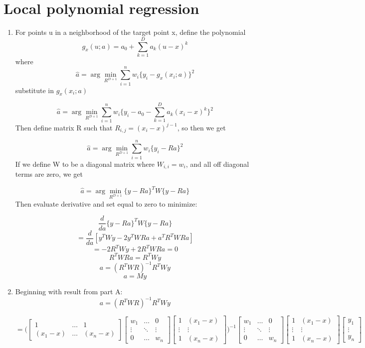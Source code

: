 \documentclass[10pt]{article}
\begin{document}
    \section*{Local polynomial regression}
        \begin{enumerate}[label=(\Alph*)]
        \item

        For points u in a neighborhood of the target point x, define the polynomial
        $$g_x(u;a) = a_0 + \sum_{k=1}^Da_k(u-x)^k$$
        where 
        $$\hat{a} = \arg \min_{R^{D+1}}  \sum_{i=1}^{n}w_i\{y_i-g_x(x_i;a)\}^2$$
        substitute in $g_x(x_i;a)$

        $$\hat{a} = \arg \min_{R^{D+1}}  \sum_{i=1}^{n}w_i\{y_i-a_0 - \sum_{k=1}^Da_k(x_i-x)^k\}^2$$
        Then define matrix R such that $R_{i,j} = (x_i-x)^{j-1}$, so then we get 

        $$\hat{a} = \arg \min_{R^{D+1}}  \sum_{i=1}^{n}w_i\{y_i-Ra\}^2$$
        If we define W to be a diagonal matrix where $W_{i,i}=w_i$, and all off diagonal terms are zero, we get

        $$\hat{a} = \arg \min_{R^{D+1}}  \{y-Ra\}^TW\{y-Ra\}$$
        Then evaluate derivative and set equal to zero to minimize:

        $$\frac{d}{da}\{y-Ra\}^TW\{y-Ra\}$$
        $$=\frac{d}{da}[y^TWy-2y^TWRa+a^TR^TWRa]$$
        $$=-2R^TWy+2R^TWRa = 0$$
        $$R^TWRa=R^TWy$$
        $$a = (R^TWR)^{-1}R^TWy$$
        $$a=My$$
        \item
        Beginning with result from part A:
        $$a = (R^TWR)^{-1}R^TWy$$


        $$=\Bigg(
        \begin{bmatrix}
        1 & \dots & 1 \\ 
        (x_1-x) & \dots & (x_n-x)
        \end{bmatrix}
        \begin{bmatrix} 
        w_1 & \dots & 0 \\ 
        \vdots & \ddots & \vdots \\ 
        0 & \dots & w_n 
        \end{bmatrix}
        \begin{bmatrix}1&(x_1-x)\\ 
        \vdots & \vdots \\ 
        1 & (x_n - x) \end{bmatrix}
        \Bigg)^{-1}
        \begin{bmatrix} 
        w_1 & \dots & 0 \\ 
        \vdots & \ddots & \vdots \\ 
        0 & \dots & w_n 
        \end{bmatrix}
        \begin{bmatrix} 
        1 &(x_1-x) \\ 
        \vdots & \vdots \\ 
        1 & (x_n - x) \end{bmatrix}
        \begin{bmatrix}
        y_1\\
        \vdots\\
        y_n
        \end{bmatrix}
        $$


\end{enumerate}
\end{document}
